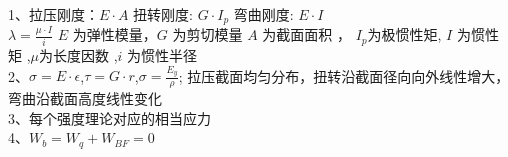 \documentclass[]{ctexbook}
\begin{document}
1、拉压刚度：$E \cdot A$ 扭转刚度: $ G \cdot I_p $ 弯曲刚度: $ E \cdot I $\\
$\lambda = \frac{\mu \cdot I}{ i }$ $E$ 为弹性模量，$ G $ 为剪切模量  $ A $ 为截面面积 ， $ I_p $为极惯性矩, $ I $ 为惯性矩
,$ \mu $为长度因数 ,$ i $ 为惯性半径\\
2、$\sigma = E \cdot \epsilon$,$ \tau = G\cdot r$,$\sigma = \frac{E_y}{\rho} $; 拉压截面均匀分布，扭转沿截面径向向外线性增大，弯曲沿截面高度线性变化 \\
3、每个强度理论对应的相当应力\\
4、$ W_b = W_q + W_{BF}= 0 $
\end{document}
